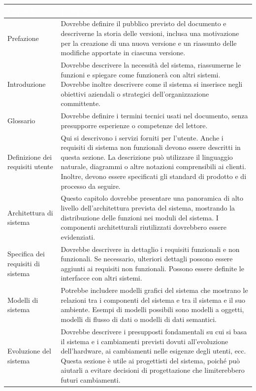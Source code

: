 \begin{table}[ht]
\centering
{}
\begin{tabular}{|p{4cm}|p{11cm}|}
\hline
\rowcolor{headerblue}
\textbf{\textcolor{white}{Capitolo}} & \textbf{\textcolor{white}{Descrizione}} \\\hline
Prefazione & Dovrebbe definire il pubblico previsto del documento e descriverne la storia delle versioni, inclusa una motivazione per la creazione di una nuova versione e un riassunto delle modifiche apportate in ciascuna versione.\\\hline
Introduzione & Dovrebbe descrivere la necessità del sistema, riassumerne le funzioni e spiegare come funzionerà con altri sistemi. Dovrebbe inoltre descrivere come il sistema si inserisce negli obiettivi aziendali o strategici dell'organizzazione committente.\\\hline
Glossario & Dovrebbe definire i termini tecnici usati nel documento, senza presupporre esperienze o competenze del lettore.\\\hline
Definizione dei requisiti utente & Qui si descrivono i servizi forniti per l'utente. Anche i requisiti di sistema non funzionali devono essere descritti in questa sezione. La descrizione può utilizzare il linguaggio naturale, diagrammi o altre notazioni comprensibili ai clienti. Inoltre, devono essere specificati gli standard di prodotto e di processo da seguire.\\\hline
Architettura di sistema & Questo capitolo dovrebbe presentare una panoramica di alto livello dell'architettura prevista del sistema, mostrando la distribuzione delle funzioni nei moduli del sistema. I componenti architetturali riutilizzati dovrebbero essere evidenziati.\\\hline
Specifica dei requisiti di sistema & Dovrebbe descrivere in dettaglio i requisiti funzionali e non funzionali. Se necessario, ulteriori dettagli possono essere aggiunti ai requisiti non funzionali. Possono essere definite le interfacce con altri sistemi.\\\hline
Modelli di sistema & Potrebbe includere modelli grafici del sistema che mostrano le relazioni tra i componenti del sistema e tra il sistema e il suo ambiente. Esempi di modelli possibili sono modelli a oggetti, modelli di flusso di dati o modelli di dati semantici.\\\hline
Evoluzione del sistema & Dovrebbe descrivere i presupposti fondamentali su cui si basa il sistema e i cambiamenti previsti dovuti all'evoluzione dell'hardware, ai cambiamenti nelle esigenze degli utenti, ecc. Questa sezione è utile ai progettisti del sistema, poiché può aiutarli a evitare decisioni di progettazione che limiterebbero futuri cambiamenti.\\\hline

\end{tabular}
\end{table}
